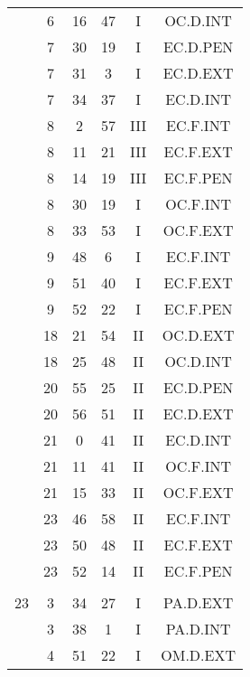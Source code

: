 \documentclass[12pt, a4paper]{article}
\begin{document}
\begin{multicols}{3}
{\begin{tabular}{c c c c c c}
	 	 	 	 & 6 & 16 & 47 & I & OC.D.INT\\%
	 	 	 	 & 7 & 30 & 19 & I & EC.D.PEN\\%
	 	 	 	 & 7 & 31 & 3 & I & EC.D.EXT\\%
	 	 	 	 & 7 & 34 & 37 & I & EC.D.INT\\%
	 	 	 	 & 8 & 2 & 57 & III & EC.F.INT\\%
	 	 	 	 & 8 & 11 & 21 & III & EC.F.EXT\\%
	 	 	 	 & 8 & 14 & 19 & III & EC.F.PEN\\%
	 	 	 	 & 8 & 30 & 19 & I & OC.F.INT\\%
	 	 	 	 & 8 & 33 & 53 & I & OC.F.EXT\\%
	 	 	 	 & 9 & 48 & 6 & I & EC.F.INT\\%
	 	 	 	 & 9 & 51 & 40 & I & EC.F.EXT\\%
	 	 	 	 & 9 & 52 & 22 & I & EC.F.PEN\\%
	 	 	 	 & 18 & 21 & 54 & II & OC.D.EXT\\%
	 	 	 	 & 18 & 25 & 48 & II & OC.D.INT\\%
	 	 	 	 & 20 & 55 & 25 & II & EC.D.PEN\\%
	 	 	 	 & 20 & 56 & 51 & II & EC.D.EXT\\%
	 	 	 	 & 21 & 0 & 41 & II & EC.D.INT\\%
	 	 	 	 & 21 & 11 & 41 & II & OC.F.INT\\%
	 	 	 	 & 21 & 15 & 33 & II & OC.F.EXT\\%
	 	 	 	 & 23 & 46 & 58 & II & EC.F.INT\\%
	 	 	 	 & 23 & 50 & 48 & II & EC.F.EXT\\%
	 	 	 	 & 23 & 52 & 14 & II & EC.F.PEN\\%
	 	 	 	 & & & & & \\%
	 	 	 	23 & 3 & 34 & 27 & I & PA.D.EXT\\%
	 	 	 	 & 3 & 38 & 1 & I & PA.D.INT\\%
	 	 	 	 & 4 & 51 & 22 & I & OM.D.EXT\\%
	 	 \end{tabular}
 	}
\end{multicols}
\end{document}
